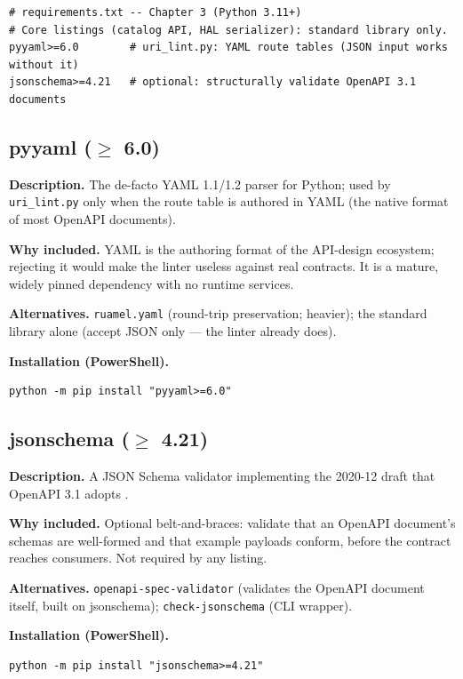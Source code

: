 \begin{verbatim}
# requirements.txt -- Chapter 3 (Python 3.11+)
# Core listings (catalog API, HAL serializer): standard library only.
pyyaml>=6.0        # uri_lint.py: YAML route tables (JSON input works without it)
jsonschema>=4.21   # optional: structurally validate OpenAPI 3.1 documents
\end{verbatim}

\subsection{pyyaml ($\geq$ 6.0)}

\textbf{Description.} The de-facto YAML 1.1/1.2 parser for Python; used by
\texttt{uri\_lint.py} only when the route table is authored in YAML (the native
format of most OpenAPI documents).

\textbf{Why included.} YAML is the authoring format of the API-design ecosystem;
rejecting it would make the linter useless against real contracts. It is a
mature, widely pinned dependency with no runtime services.

\textbf{Alternatives.} \texttt{ruamel.yaml} (round-trip preservation; heavier);
the standard library alone (accept JSON only --- the linter already does).

\textbf{Installation (PowerShell).}
\begin{verbatim}
python -m pip install "pyyaml>=6.0"
\end{verbatim}

\subsection{jsonschema ($\geq$ 4.21)}

\textbf{Description.} A JSON Schema validator implementing the 2020-12 draft
that OpenAPI 3.1 adopts \cite{openapi31}.

\textbf{Why included.} Optional belt-and-braces: validate that an OpenAPI
document's schemas are well-formed and that example payloads conform, before
the contract reaches consumers. Not required by any listing.

\textbf{Alternatives.} \texttt{openapi-spec-validator} (validates the OpenAPI
document itself, built on jsonschema); \texttt{check-jsonschema} (CLI wrapper).

\textbf{Installation (PowerShell).}
\begin{verbatim}
python -m pip install "jsonschema>=4.21"
\end{verbatim}

